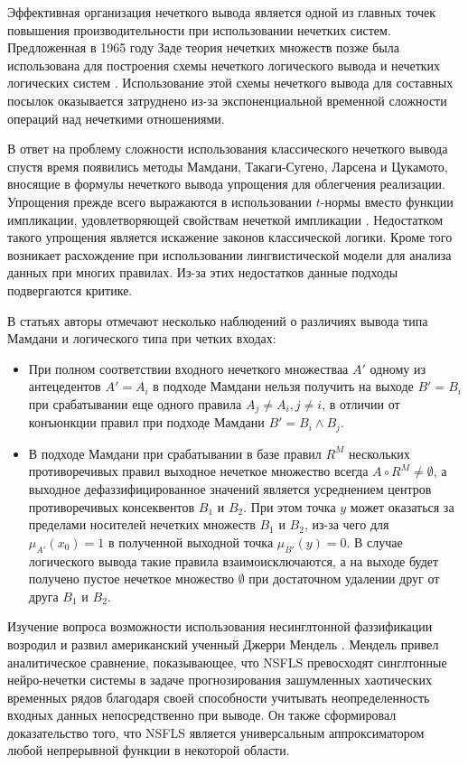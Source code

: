 Эффективная организация нечеткого вывода является одной из главных точек повышения производительности при использовании нечетких систем.  Предложенная в 1965 году Заде теория нечетких множеств \cite{zadeh1965} позже была использована для построения схемы нечеткого логического вывода \cite{Zadeh1996} и нечетких логических систем \cite{rutkovskiy2010}. Использование этой схемы нечеткого вывода для составных посылок оказывается затруднено из-за экспоненциальной временной сложности операций над нечеткими отношениями.

В ответ на проблему сложности использования классического нечеткого вывода спустя время появились методы Мамдани, Такаги-Сугено, Ларсена и Цукамото, вносящие в формулы нечеткого вывода упрощения для облегчения реализации. Упрощения прежде всего выражаются в использовании $t$-нормы вместо функции импликации, удовлетворяющей свойствам нечеткой импликации \cite{rutkovskiy2010}. Недостатком такого упрощения является искажение законов классической логики. Кроме того возникает расхождение при использовании лингвистической модели для анализа данных при многих правилах. Из-за этих недостатков данные подходы подвергаются критике.

В статьях \cite{Dubois2012, Izquierdo2018} авторы отмечают несколько наблюдений о различиях вывода типа Мамдани и логического типа при четких входах:
\begin{itemize}
	\item При полном соответствии входного нечеткого множестваа $A'$ одному из антецедентов $A' = A_i$ в подходе Мамдани нельзя получить на выходе $B' = B_i$ при срабатывании еще одного правила $A_j \ne A_i, j \ne i$, в отличии от конъюнкции правил при подходе Мамдани $B' = B_i \wedge B_j$.
	\item В подходе Мамдани при срабатывании в базе правил $R^M$ нескольких противоречивых правил выходное нечеткое множество всегда $A \circ R^M \ne \emptyset$, а выходное дефаззифицированное значений является усреднением центров противоречивых консеквентов $B_1$ и $B_2$. При этом точка $y$ может оказаться за пределами носителей нечетких множеств  $B_1$ и $B_2$, из-за чего для $\mu_{A'}(x_0)=1$ в полученной выходной точка $\mu_{B'}(y)=0$. В случае логического вывода такие правила взаимоисключаются, а на выходе будет получено пустое нечеткое множество $\emptyset$ при достаточном удалении друг от друга $B_1$ и $B_2$.
\end{itemize}

Изучение вопроса возможности использования несинглтонной фаззификации возродил и развил американский ученный Джерри Мендель \cite{Mendel2017}. Мендель привел аналитическое сравнение, показывающее, что NSFLS превосходят синглтонные нейро-нечетки системы в задаче прогнозирования зашумленных хаотических временных рядов благодаря своей способности учитывать неопределенность входных данных непосредственно при выводе. Он также сформировал доказательство того, что NSFLS является универсальным аппроксиматором любой непрерывной функции в некоторой области.


